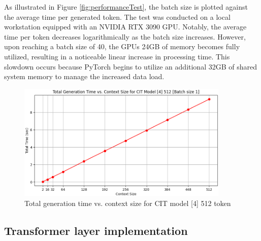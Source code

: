 As illustrated in Figure \ref{fig:performanceTest}, the batch size is plotted against the average time per generated token. The test was conducted on a local workstation equipped with an NVIDIA RTX 3090 GPU. Notably, the average time per token decreases logarithmically as the batch size increases. However, upon reaching a batch size of 40, the GPUs 24GB of memory becomes fully utilized, resulting in a noticeable linear increase in processing time. This slowdown occurs because PyTorch begins to utilize an additional 32GB of shared system memory to manage the increased data load.

\begin{figure}[H]
    \centering
    \includegraphics[width=0.9\textwidth]{imgs/performanceTest2.png}
    \caption{Total generation time vs. context size for CIT model [4] 512 token}
    \label{fig:performanceTest2}
\end{figure}


\newpage

\subsection{Transformer layer implementation}
\label{sec:transformer_layer_Python}

